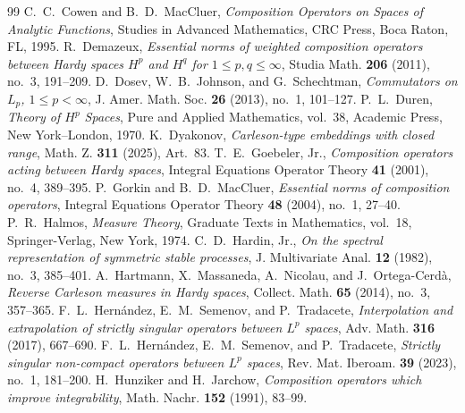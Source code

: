 \documentclass[10pt,a4paper]{amsart}
\begin{document}
\begin{thebibliography}{99}
 C.~C.~Cowen and B.~D.~MacCluer, \textit{Composition Operators on Spaces of Analytic Functions}, Studies in Advanced Mathematics, CRC Press, Boca Raton, FL, 1995.
 R.~Demazeux, \textit{Essential norms of weighted composition operators between Hardy spaces \(H^p\) and \(H^q\) for \(1\le p,q\le\infty\)}, Studia Math. \textbf{206} (2011), no.~3, 191--209.
 D.~Dosev, W.~B.~Johnson, and G.~Schechtman, \textit{Commutators on \(L_p\), \(1\le p<\infty\)}, J. Amer. Math. Soc. \textbf{26} (2013), no.~1, 101--127.
 P.~L.~Duren, \textit{Theory of \(H^p\) Spaces}, Pure and Applied Mathematics, vol.~38, Academic Press, New York--London, 1970.
 K.~Dyakonov, \textit{Carleson-type embeddings with closed range}, Math. Z. \textbf{311} (2025), Art.~83.
 T.~E.~Goebeler, Jr., \textit{Composition operators acting between Hardy spaces}, Integral Equations Operator Theory \textbf{41} (2001), no.~4, 389--395.
 P.~Gorkin and B.~D.~MacCluer, \textit{Essential norms of composition operators}, Integral Equations Operator Theory \textbf{48} (2004), no.~1, 27--40.
 P.~R.~Halmos, \textit{Measure Theory}, Graduate Texts in Mathematics, vol.~18, Springer-Verlag, New York, 1974.
 C.~D.~Hardin, Jr., \textit{On the spectral representation of symmetric stable processes}, J. Multivariate Anal. \textbf{12} (1982), no.~3, 385--401.
 A.~Hartmann, X.~Massaneda, A.~Nicolau, and J.~Ortega-Cerd\`a, \textit{Reverse Carleson measures in Hardy spaces}, Collect. Math. \textbf{65} (2014), no.~3, 357--365.
 F.~L.~Hern\'andez, E.~M.~Semenov, and P.~Tradacete, \textit{Interpolation and extrapolation of strictly singular operators between \(L^p\) spaces}, Adv. Math. \textbf{316} (2017), 667--690.
 F.~L.~Hern\'andez, E.~M.~Semenov, and P.~Tradacete, \textit{Strictly singular non-compact operators between \(L^p\) spaces}, Rev. Mat. Iberoam. \textbf{39} (2023), no.~1, 181--200.
 H.~Hunziker and H.~Jarchow, \textit{Composition operators which improve integrability}, Math. Nachr. \textbf{152} (1991), 83--99.

\end{thebibliography}
\end{document}
